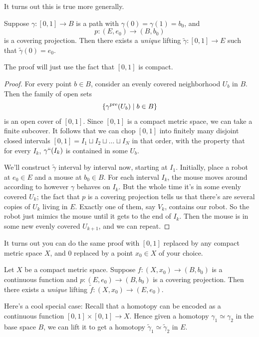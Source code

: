It turns out this is true more generally.
\begin{theorem}
	Suppose $\gamma : [0,1] \to B$ is a path with $\gamma(0) = \gamma(1) = b_0$, and 
	\[ p : (E,e_0) \to (B,b_0) \]
	is a covering projection.
	Then there exists a \emph{unique} lifting $\tilde\gamma : [0,1] \to E$
	such that $\tilde\gamma(0) = e_0$.
\end{theorem}
The proof will just use the fact that $[0,1]$ is compact.
\begin{proof}
	For every point $b \in B$, consider an evenly covered neighborhood $U_b$ in $B$.
	Then the family of open sets
	\[ \left\{ \gamma^{\text{pre}}(U_b) \mid b \in B \right\} \]
	is an open cover of $[0,1]$.
	Since $[0,1]$ is a compact metric space, we can take a finite subcover.
	It follows that we can chop $[0,1]$ into finitely many disjoint closed intervals
	$[0,1] = I_1 \sqcup I_2 \sqcup \dots \sqcup I_N$ in that order,
	with the property that for every $I_k$, $\gamma``(I_k)$ is contained
	in some $U_b$.

	We'll construct $\tilde\gamma$ interval by interval now,
	starting at $I_1$.
	Initially, place a robot at $e_0 \in E$ and a mouse at $b_0 \in B$.
	For each interval $I_k$, the mouse moves around according
	to however $\gamma$ behaves on $I_k$.
	But the whole time it's in some evenly covered $U_k$; the fact that $p$ is a covering projection tells us that there's are several copies of $U_k$ living in $E$. Exactly one of them, say $V_k$, contains our robot.
	So the robot just mimics the mouse until it gets to the end of $I_k$.
	Then the mouse is in some new evenly covered $U_{k+1}$,
	and we can repeat.
\end{proof}

It turns out you can do the same proof with $[0,1]$ replaced by
any compact metric space $X$, and $0$ replaced by a point $x_0 \in X$ of your choice.
\begin{theorem}
	Let $X$ be a compact metric space.
	Suppose $f : (X,x_0) \to (B,b_0)$ is a continuous function and $p : (E,e_0) \to (B,b_0)$
	is a covering projection.
	Then there exists a \emph{unique} lifting $\tilde f : (X,x_0) \to (E,e_0)$.
\end{theorem}
\begin{remark}
	Here's a cool special case:
	Recall that a homotopy can be encoded as a continuous function $[0,1] \times [0,1] \to X$.
	Hence given a homotopy $\gamma_1 \simeq \gamma_2$ in the base space $B$, we can lift it to get
 a homotopy $\tilde\gamma_1 \simeq \tilde\gamma_2$ in $E$.
\end{remark}

